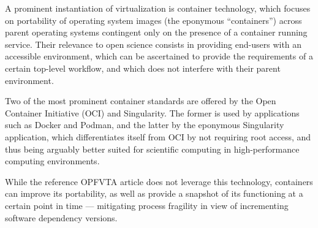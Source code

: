 A prominent instantiation of virtualization is container technology, which focuses on portability of operating system images (the eponymous “containers”) across parent operating systems contingent only on the presence of a container running service.
Their relevance to open science consists in providing end-users with an accessible environment, which can be ascertained to provide the requirements of a certain top-level workflow, and which does not interfere with their parent environment.

Two of the most prominent container standards are offered by the Open Container Initiative (OCI) and Singularity.
The former is used by applications such as Docker and Podman, and the latter by the eponymous Singularity application, which differentiates itself from OCI by not requiring root access, and thus being arguably better suited for scientific computing in high-performance computing environments.

While the reference OPFVTA article does not leverage this technology, containers can improve its portability, as well as provide a snapshot of its functioning at a certain point in time — mitigating process fragility in view of incrementing software dependency versions.
